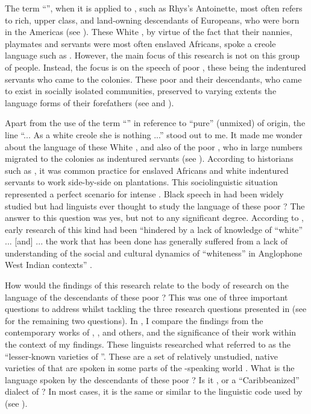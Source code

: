The term ``'', when it is applied to , such as Rhys's Antoinette, most often refers to rich, upper class, and land-owning descendants of Europeans, who were born in the Americas (see \citealt{Cassidy82}). These White , by virtue of the fact that their nannies, playmates and servants were most often enslaved Africans, spoke a creole language such as  \citep{Cassidy82}. However, the main focus of this research is not on this group of people. Instead, the focus is on the speech of poor , these being the indentured servants who came to the  colonies. These poor  and their descendants, who came to exist in socially isolated communities, preserved to varying extents the language forms of their  forefathers (see \citealt{Aceto10} and \citealt{Williams03}).

Apart from the use of the term ``'' in reference to ``pure'' (unmixed)  of  origin, the line ``... As a white creole she is nothing ...'' stood out to me. It made me wonder about the language of these White , and also of the poor , who in large numbers migrated to the colonies as indentured servants (see ). According to historians such as \citet{Galenson02}, it was common practice for enslaved Africans and white indentured servants to work side-by-side on plantations. This sociolinguistic situation represented a perfect scenario for intense . Black speech in  had been widely studied but had  linguists ever thought to study the language of these poor ? The answer to this question was yes, but not to any significant degree. According to \citet{Williams03}, early research of this kind had been ``hindered by a lack of knowledge of ``white''  ... [and] ... the work that has been done has generally suffered from a lack of understanding of the social and cultural dynamics of ``whiteness'' in Anglophone West Indian contexts'' \citep[95]{Williams03}.

How would the findings of this research relate to the body of research on the language of the descendants of these poor ? This was one of three important questions to address whilst tackling the three research questions presented in  (see  for the remaining two questions). In , I compare the findings from the contemporary works of \citet{Aceto10}, \citet{Williams03}, \citet{Blake04} and others, and the significance of their work within the context of my findings. These linguists researched what \citet[30]{Trudgill02} referred to as the ``lesser-known varieties of ''. These are a set of relatively unstudied, native varieties of  that are spoken in some parts of the -speaking world \citep{Trudgill02}. What is the language spoken by the descendants of these poor ? Is it , or a ``Caribbeanized'' dialect of ? In most cases, it is the same or similar to the linguistic code used by  (see \citealt{Cassidy82}).


